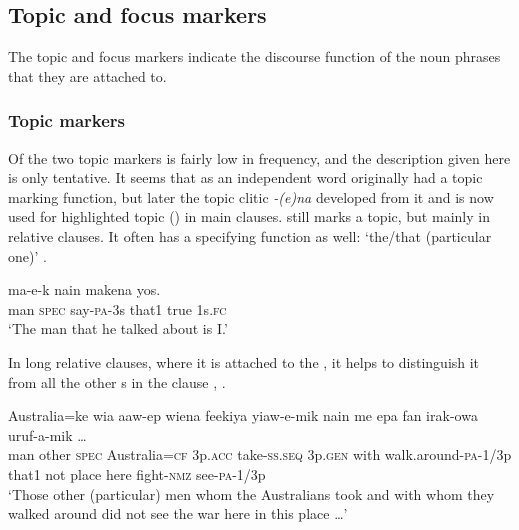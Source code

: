 \subsection{Topic and focus markers}
{}
The topic and focus markers indicate the discourse function of the noun phrases that they are attached to.

\subsubsection{Topic markers}\label{sec:3.12.7.1}
{}
Of the two topic markers  is fairly low in frequency, and the description given here is only tentative. It seems that  as an independent word originally had a topic marking function, but later the topic clitic \textit{-(e)na} developed from it and is now used for highlighted topic () in main clauses.  still marks a topic, but mainly in relative clauses. It often has a specifying function as well: `the/that (particular one)' . 

\ea%
\label{ex:3:x1681}
\gll {\ob}  ma-e-k nain{\cb} makena yos. \\
man \textsc{spec} say-\textsc{pa}-3s that1 true 1s.\textsc{fc}\\
\glt`The man that he talked about is I.'
\z

In long relative clauses, where it is attached to the , it helps to distinguish it from all the other s in the clause , . 

\ea%
\label{ex:3:x1815}
\gll {\ob}   Australia=ke wia aaw-ep wiena feekiya yiaw-e-mik nain{\cb} me epa fan irak-owa uruf-a-mik {\dots}\\
man other \textsc{spec} Australia=\textsc{cf} 3p.\textsc{acc} take-\textsc{ss}.\textsc{seq} 3p.\textsc{gen} with walk.around-\textsc{pa}-1/3p that1 not place here fight-\textsc{nmz} see-\textsc{pa}-1/3p\\
\glt`Those other (particular) men whom the Australians took and with whom they walked around did not see the war here in this place {\dots}'
\z

